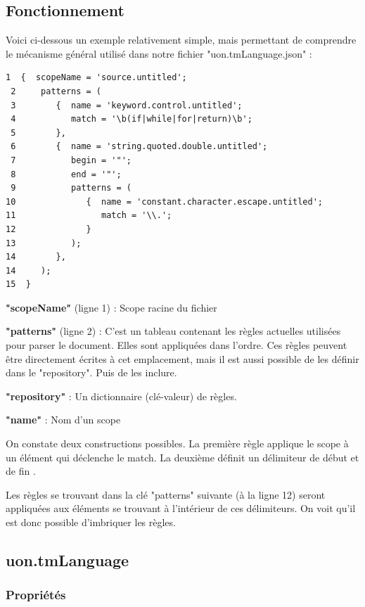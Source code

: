 \documentclass[
    iict, %
    il, %
]{heig-tb}
\begin{document}
\subsection{Fonctionnement}

Voici ci-dessous un exemple relativement simple, mais permettant de comprendre le mécanisme général utilisé dans notre fichier "uon.tmLanguage.json" :
\begin{lstlisting}[frame=single, caption={Textmate grammar},label={Textmate grammar}]
 1  {  scopeName = 'source.untitled';
 2     patterns = (
 3        {  name = 'keyword.control.untitled';
 4           match = '\b(if|while|for|return)\b';
 5        },
 6        {  name = 'string.quoted.double.untitled';
 7           begin = '"';
 8           end = '"';
 9           patterns = (
10              {  name = 'constant.character.escape.untitled';
11                 match = '\\.';
12              }
13           );
14        },
14     );
15  }
\end{lstlisting}
\textbf{"scopeName"} (ligne 1) : Scope racine du fichier

\textbf{"patterns"} (ligne 2) : C'est un tableau contenant les règles actuelles utilisées pour parser le document. Elles sont appliquées dans l'ordre.
Ces règles peuvent être directement écrites à cet emplacement, mais il est aussi possible de les définir dans le "repository". Puis de les inclure.

\textbf{"repository"} : Un dictionnaire (clé-valeur) de règles.

\textbf{"name"} : Nom d'un scope

On constate deux constructions possibles.
La première règle applique le scope à un élément qui déclenche le match.
La deuxième définit un délimiteur de début et de fin .

Les règles se trouvant dans la clé "patterns" suivante (à la ligne 12) seront appliquées aux éléments se trouvant à l'intérieur de ces délimiteurs.
On voit qu'il est donc possible d'imbriquer les règles.

\subsection{uon.tmLanguage}



\subsubsection{Propriétés}
\end{document}
